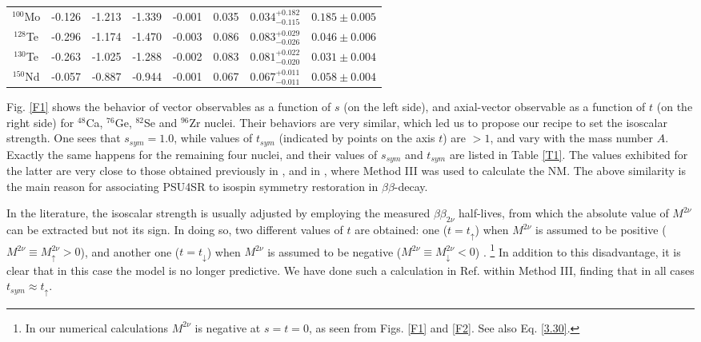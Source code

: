 \documentclass[nofootinbib,twocolumn,eqsecnum,floats,aps]{revtex4}
\def\b {{\beta}}
\begin{document}
{\begin{table*}[t]
\begin{tabular}{c|ccc|ccc|c}
 $^{100}$Mo&    -0.126 &  -1.213 &   -1.339 &        -0.001 &   0.035 & $0.034^{+0.182}_{-0.115}$ & $0.185\pm0.005$\\
 $^{128}$Te&    -0.296 &  -1.174 &   -1.470 &        -0.003 &   0.086 & $0.083^{+0.029}_{-0.026}$ & $0.046\pm0.006$\\
 $^{130}$Te&    -0.263 &  -1.025 &   -1.288 &        -0.002 &   0.083 & $0.081^{+0.022}_{-0.020}$ & $0.031\pm0.004$\\
 $^{150}$Nd&    -0.057 &  -0.887 &   -0.944 &        -0.001 &   0.067 & $0.067^{+0.011}_{-0.011}$ & $0.058\pm0.004$\\
 \hline
\end{tabular}\end{table*}



Fig. \ref{F1} shows the behavior of vector observables as a function of $s$ (on the left side), and   axial-vector observable as a function of $t$ (on the right side) for $^{48}$Ca, $^{76}$Ge, $^{82}$Se and $^{96}$Zr nuclei.
Their behaviors are very similar, which led us to propose our recipe to set the isoscalar strength.
One sees that $s_{sym}= 1.0$, while   values of $t_{sym}$ (indicated by points on the axis $t$)
are $>1$, and vary with the mass number $A$.  Exactly the same happens for  the remaining four nuclei,
and their values of $s_{sym}$ and $t_{sym}$ are listed in Table \ref{T1}. The values exhibited for the latter
are very close to those obtained previously in \cite[Table 4]{Krm94},
and in \cite[Table 4.9]{Fer16}, where  Method III was used
to calculate the NM.
The  above similarity is the main reason for associating PSU4SR %
to  isospin symmetry restoration in  $\b\b$-decay.


In the literature, the  isoscalar strength is usually adjusted by employing the
measured $\b\b_{2\nu}$ half-lives,  from which the absolute value of $M^{2\nu}$
can be extracted but not its sign. In doing so, two different values of $t$
are obtained: one ($t=t_\uparrow$)  when $M^{2\nu} $ is  assumed
to be positive ($M^{2\nu}\equiv M^{2\nu}_\uparrow>0$), and another one  ($t=t_\downarrow$)   when $M^{2\nu}$ is  assumed
to be negative  ($M^{2\nu}\equiv M^{2\nu}_\downarrow<0$) .
\footnote{In our numerical calculations  $M^{2\nu}$ is negative at $s=t=0$, as seen from Figs. \ref{F1} and     \ref{F2}. See also Eq. \ref{3.30}.}
In addition to this disadvantage, it is clear that in this case the model is no longer
predictive.
We have done such a calculation in Ref.
\cite{Krm94} within Method III, finding that  in all  cases $t_{sym}\approx t_\uparrow$.

}
\end{document}
